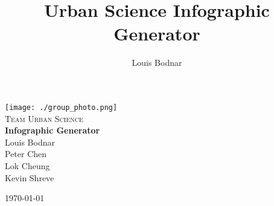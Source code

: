 \documentclass[11pt,a4paper,oneside]{article}
\author{Louis Bodnar}
\title{Urban Science Infographic Generator}
\begin{document}
\begin{titlepage}

\begin{center}

\texttt{[image: ./group\_photo.png]}\\[1cm]    

\textsc{\LARGE Team Urban Science}\\[1.5cm]

{ \huge \bfseries Infographic Generator}\\[0.4cm]

Louis Bodnar\\
Peter Chen\\
Lok Cheung\\
Kevin Shreve\\

\vfill

{\large \today}

\end{center}

\end{titlepage}


\tableofcontents
\end{document}
